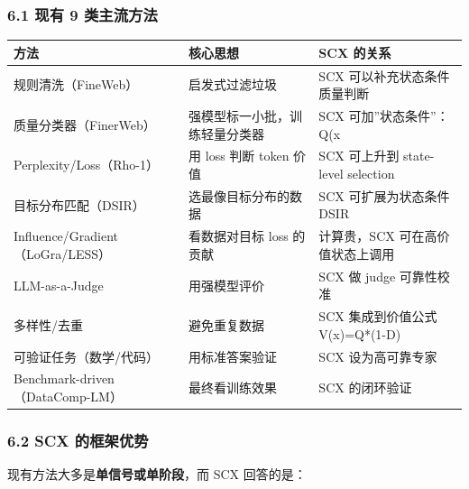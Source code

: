 \documentclass[
  12pt,
]{ctexart}
\begin{document}
\subsubsection{6.1 现有 9
类主流方法}\label{ux73b0ux6709-9-ux7c7bux4e3bux6d41ux65b9ux6cd5}

\begin{longtable}[]{@{}
  >{\raggedright\arraybackslash}p{}
  >{\raggedright\arraybackslash}p{}
  >{\raggedright\arraybackslash}p{}@{}}
\toprule\noalign{}
\begin{minipage}[b]{\linewidth}\raggedright
方法
\end{minipage} & \begin{minipage}[b]{\linewidth}\raggedright
核心思想
\end{minipage} & \begin{minipage}[b]{\linewidth}\raggedright
SCX 的关系
\end{minipage} \\
\midrule\noalign{}
\endhead
\bottomrule\noalign{}
\endlastfoot
规则清洗（FineWeb） & 启发式过滤垃圾 & SCX 可以补充状态条件质量判断 \\
质量分类器（FinerWeb） & 强模型标一小批，训练轻量分类器 & SCX
可加''状态条件''：Q(x \\
Perplexity/Loss（Rho-1） & 用 loss 判断 token 价值 & SCX 可上升到
state-level selection \\
目标分布匹配（DSIR） & 选最像目标分布的数据 & SCX 可扩展为状态条件
DSIR \\
Influence/Gradient（LoGra/LESS） & 看数据对目标 loss 的贡献 &
计算贵，SCX 可在高价值状态上调用 \\
LLM-as-a-Judge & 用强模型评价 & SCX 做 judge 可靠性校准 \\
多样性/去重 & 避免重复数据 & SCX 集成到价值公式 V(x)=Q*(1-D) \\
可验证任务（数学/代码） & 用标准答案验证 & SCX 设为高可靠专家 \\
Benchmark-driven（DataComp-LM） & 最终看训练效果 & SCX 的闭环验证 \\
\end{longtable}

\subsubsection{6.2 SCX
的框架优势}\label{scx-ux7684ux6846ux67b6ux4f18ux52bf}

现有方法大多是\textbf{单信号或单阶段}，而 SCX 回答的是：
\end{document}
